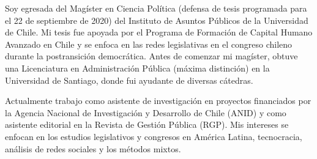 




\par{Soy egresada del Magíster en Ciencia Política (defensa de tesis programada para el 22 de septiembre de 2020) del Instituto de Asuntos Públicos de la Universidad de Chile. Mi tesis fue apoyada por el Programa de Formación de Capital Humano Avanzado en Chile y se enfoca en las redes legislativas en el congreso chileno durante la postransición democrática. Antes de comenzar mi magíster, obtuve una Licenciatura en Administración Pública (máxima distinción) en la Universidad de Santiago, donde fui ayudante de diversas cátedras.

Actualmente trabajo como asistente de investigación en proyectos financiados por la Agencia Nacional de Investigación y Desarrollo de Chile (ANID) y como asistente editorial en la Revista de Gestión Pública (RGP). Mis intereses se enfocan en los estudios legislativos y congresos en América Latina, tecnocracia, análisis de redes sociales y los métodos mixtos.}\\
